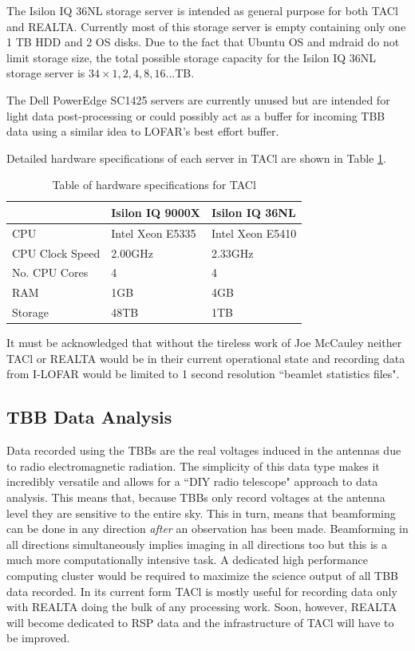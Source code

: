 The Isilon IQ 36NL storage server is intended as general purpose for both TACl and REALTA. Currently most of this storage server is empty containing only one 1 TB HDD and 2 OS disks. Due to the fact that Ubuntu OS and mdraid do not limit storage size, the total possible storage capacity for the Isilon IQ 36NL storage server is  $34 \times 1,2,4,8,16...$TB. 

The Dell PowerEdge SC1425 servers are currently unused but are intended for light data post-processing or could possibly act as a buffer for incoming TBB data using a similar idea to LOFAR's best effort buffer.

Detailed hardware specifications of each server in TACl are shown in Table \ref{table:TAClspecs}.

\begin{center}
\begin{table}[ht]
\centering
\caption[Table of hardware specifications for TACl]{Table of hardware specifications for TACl}
\begin{tabular}{l|l|l}

 & Isilon IQ 9000X & Isilon IQ 36NL \\
\hline
CPU       &  Intel Xeon E5335        & Intel Xeon E5410            \\
CPU Clock Speed & 2.00GHz & 2.33GHz  \\
No. CPU Cores & 4 & 4  \\
RAM       & 1GB          & 4GB            \\
Storage   & 48TB          & 1TB           
\end{tabular}

\label{table:TAClspecs}
\end{table}

\end{center}

It must be acknowledged that without the tireless work of Joe McCauley neither TACl or REALTA would be in their current operational state and recording data from I-LOFAR would be limited to 1 second resolution ``beamlet statistics files".

\subsection{TBB Data Analysis}
\label{sec:tbb_data}
Data recorded using the TBBs are the real voltages induced in the antennas due to radio electromagnetic radiation. The simplicity of this data type makes it incredibly versatile and allows for a ``DIY radio telescope" approach to data analysis. This means that, because TBBs only record voltages at the antenna level they are sensitive to the entire sky. This in turn, means that beamforming can be done in any direction \textit{after} an observation has been made. Beamforming in all directions simultaneously implies imaging in all directions too but this is a much more computationally intensive task. A dedicated high performance computing cluster would be required to maximize the science output of all TBB data recorded. In its current form TACl is mostly useful for recording data only with REALTA doing the bulk of any processing work. Soon, however, REALTA will become dedicated to RSP data and the infrastructure of TACl will have to be improved.

